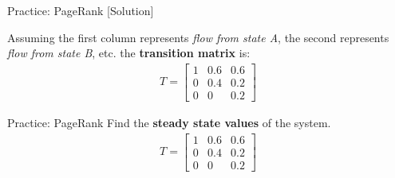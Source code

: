 \begin{frame}{Practice: PageRank [Solution]}
    \begin{center}
    \end{center}
    Assuming the first column represents \textit{flow from state A}, the second represents \textit{flow from state B}, etc. the \textbf{transition matrix} is:
    \begin{align*}
        T =  \begin{bmatrix}
            1 & 0.6 & 0.6 \\
            0 & 0.4 & 0.2 \\
            0 & 0 & 0.2    
        \end{bmatrix}
    \end{align*}
\end{frame}

\begin{frame}{Practice: PageRank}
    Find the \textbf{steady state values} of the system. 
    \begin{align*}    
        T =  \begin{bmatrix}
            1 & 0.6 & 0.6 \\
            0 & 0.4 & 0.2 \\
            0 & 0 & 0.2    
        \end{bmatrix}
    \end{align*}
\end{frame}

